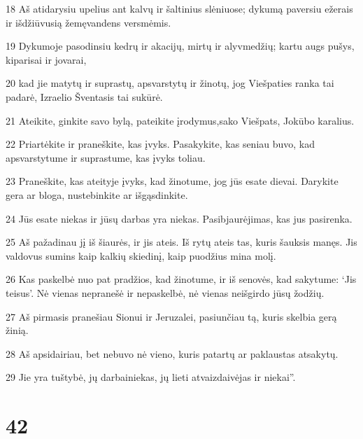 \par 18 Aš atidarysiu upelius ant kalvų ir šaltinius slėniuose; dykumą paversiu ežerais ir išdžiūvusią žemę­vandens versmėmis. 
\par 19 Dykumoje pasodinsiu kedrų ir akacijų, mirtų ir alyvmedžių; kartu augs pušys, kiparisai ir jovarai, 
\par 20 kad jie matytų ir suprastų, apsvarstytų ir žinotų, jog Viešpaties ranka tai padarė, Izraelio Šventasis tai sukūrė. 
\par 21 Ateikite, ginkite savo bylą, pateikite įrodymus,­sako Viešpats, Jokūbo karalius.­ 
\par 22 Priartėkite ir praneškite, kas įvyks. Pasakykite, kas seniau buvo, kad apsvarstytume ir suprastume, kas įvyks toliau. 
\par 23 Praneškite, kas ateityje įvyks, kad žinotume, jog jūs esate dievai. Darykite gera ar bloga, nustebinkite ar išgąsdinkite. 
\par 24 Jūs esate niekas ir jūsų darbas yra niekas. Pasibjaurėjimas, kas jus pasirenka. 
\par 25 Aš pažadinau jį iš šiaurės, ir jis ateis. Iš rytų ateis tas, kuris šauksis manęs. Jis valdovus sumins kaip kalkių skiedinį, kaip puodžius mina molį. 
\par 26 Kas paskelbė nuo pat pradžios, kad žinotume, ir iš senovės, kad sakytume: ‘Jis teisus’. Nė vienas nepranešė ir nepaskelbė, nė vienas neišgirdo jūsų žodžių. 
\par 27 Aš pirmasis pranešiau Sionui ir Jeruzalei, pasiunčiau tą, kuris skelbia gerą žinią. 
\par 28 Aš apsidairiau, bet nebuvo nė vieno, kuris patartų ar paklaustas atsakytų. 
\par 29 Jie yra tuštybė, jų darbai­niekas, jų lieti atvaizdai­vėjas ir niekai”.



\chapter{42}


